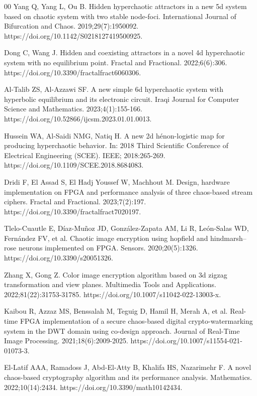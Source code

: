 \documentclass[preprint,12pt]{elsarticle}
\begin{document}
\begin{thebibliography}{00}
Yang Q, Yang L, Ou B. Hidden hyperchaotic attractors in a new 5d system based on chaotic system with two stable node-foci. International Journal of Bifurcation and Chaos. 2019;29(7):1950092. https://doi.org/10.1142/S0218127419500925.

Dong C, Wang J. Hidden and coexisting attractors in a novel 4d hyperchaotic system with no equilibrium point. Fractal and Fractional. 2022;6(6):306. https://doi.org/10.3390/fractalfract6060306.

Al-Talib ZS, Al-Azzawi SF. A new simple 6d hyperchaotic system with hyperbolic equilibrium and its electronic circuit. Iraqi Journal for Computer Science and Mathematics. 2023;4(1):155-166. https://doi.org/10.52866/ijcsm.2023.01.01.0013.

Hussein WA, Al-Saidi NMG, Natiq H. A new 2d hénon-logistic map for producing hyperchaotic behavior. In: 2018 Third Scientific Conference of Electrical Engineering (SCEE). IEEE; 2018:265-269. https://doi.org/10.1109/SCEE.2018.8684083.

Dridi F, El Assad S, El Hadj Youssef W, Machhout M. Design, hardware implementation on FPGA and performance analysis of three chaos-based stream ciphers. Fractal and Fractional. 2023;7(2):197. https://doi.org/10.3390/fractalfract7020197.

Tlelo-Cuautle E, Díaz-Muñoz JD, González-Zapata AM, Li R, León-Salas WD, Fernández FV, et al. Chaotic image encryption using hopfield and hindmarsh–rose neurons implemented on FPGA. Sensors. 2020;20(5):1326. https://doi.org/10.3390/s20051326.

Zhang X, Gong Z. Color image encryption algorithm based on 3d zigzag transformation and view planes. Multimedia Tools and Applications. 2022;81(22):31753-31785. https://doi.org/10.1007/s11042-022-13003-x.

Kaibou R, Azzaz MS, Benssalah M, Teguig D, Hamil H, Merah A, et al. Real-time FPGA implementation of a secure chaos-based digital crypto-watermarking system in the DWT domain using co-design approach. Journal of Real-Time Image Processing. 2021;18(6):2009-2025. https://doi.org/10.1007/s11554-021-01073-3.

El-Latif AAA, Ramadoss J, Abd-El-Atty B, Khalifa HS, Nazarimehr F. A novel chaos-based cryptography algorithm and its performance analysis. Mathematics. 2022;10(14):2434. https://doi.org/10.3390/math10142434.


\end{thebibliography}
\end{document}
